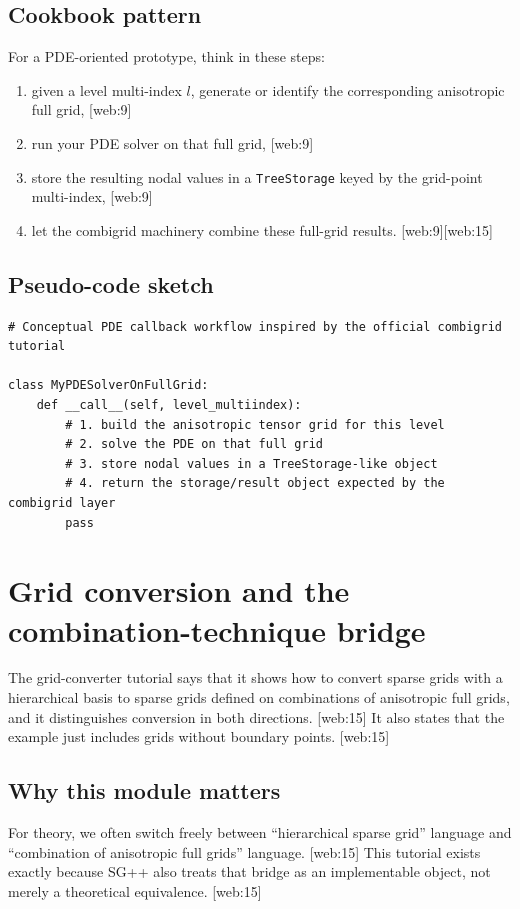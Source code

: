 \documentclass[11pt,a4paper]{article}
\begin{document}
\subsection{Cookbook pattern}
For a PDE-oriented prototype, think in these steps:
\begin{enumerate}[leftmargin=1.5em]
\item given a level multi-index \(l\), generate or identify the corresponding anisotropic full grid, [web:9]
\item run your PDE solver on that full grid, [web:9]
\item store the resulting nodal values in a \texttt{TreeStorage} keyed by the grid-point multi-index, [web:9]
\item let the combigrid machinery combine these full-grid results. [web:9][web:15]
\end{enumerate}

\subsection{Pseudo-code sketch}
\begin{lstlisting}[style=py]
# Conceptual PDE callback workflow inspired by the official combigrid tutorial

class MyPDESolverOnFullGrid:
    def __call__(self, level_multiindex):
        # 1. build the anisotropic tensor grid for this level
        # 2. solve the PDE on that full grid
        # 3. store nodal values in a TreeStorage-like object
        # 4. return the storage/result object expected by the combigrid layer
        pass
\end{lstlisting}

\section{Grid conversion and the combination-technique bridge}

The grid-converter tutorial says that it shows how to convert sparse grids with a hierarchical basis to sparse grids defined on combinations of anisotropic full grids, and it distinguishes conversion in both directions. [web:15]  
It also states that the example just includes grids without boundary points. [web:15]  

\subsection{Why this module matters}
For theory, we often switch freely between ``hierarchical sparse grid'' language and ``combination of anisotropic full grids'' language. [web:15]  
This tutorial exists exactly because SG++ also treats that bridge as an implementable object, not merely a theoretical equivalence. [web:15]  
\end{document}
